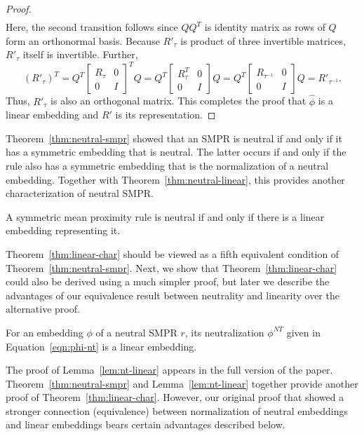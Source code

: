 \documentclass[prodmode]{acmsmall-ec14}
\newcommand{\nt}{NT}
\begin{document}
\begin{proof}
\begin{align*}
\end{align*}
Here, the second transition follows since $Q Q^T$ is identity matrix as rows of $Q$ form an orthonormal basis. Because $R'_{\tau}$ is product of three invertible matrices, $R'_{\tau}$ itself is invertible. Further, 
$$
(R'_{\tau})^T = Q^T \left[ \begin{smallmatrix} R_{\tau} & 0 \\ 0 & I \end{smallmatrix} \right]^T Q = Q^T \left[ \begin{smallmatrix} R_{\tau}^T & 0 \\ 0 & I \end{smallmatrix} \right] Q = Q^T \left[ \begin{smallmatrix} R_{\tau^{-1}} & 0 \\ 0 & I \end{smallmatrix} \right] Q
 = R'_{\tau^{-1}}.
 $$
Thus, $R'_{\tau}$ is also an orthogonal matrix. This completes the proof that $\hat{\phi}$ is a linear embedding and $R'$ is its representation.
\end{proof}

Theorem~\ref{thm:neutral-smpr} showed that an SMPR is neutral if and only if it has a symmetric embedding that is neutral. The latter occurs if and only if the rule also has a symmetric embedding that is the normalization of a neutral embedding. Together with Theorem~\ref{thm:neutral-linear}, this provides another characterization of neutral SMPR. 

\begin{theorem}
A symmetric mean proximity rule is neutral if and only if there is a linear embedding representing it.
\label{thm:linear-char}
\end{theorem}

Theorem~\ref{thm:linear-char} should be viewed as a fifth equivalent condition of Theorem~\ref{thm:neutral-smpr}. Next, we show that Theorem~\ref{thm:linear-char} could also be derived using a much simpler proof, but later we describe the advantages of our equivalence result between neutrality and linearity over the alternative proof. 

\begin{lemma}
For an embedding $\phi$ of a neutral SMPR $r$, its neutralization $\phi^{\nt}$ given in Equation~\eqref{eqn:phi-nt} is a linear embedding.
\label{lem:nt-linear}
\end{lemma}

The proof of Lemma~\ref{lem:nt-linear} appears in the full version of the paper. %
Theorem~\ref{thm:neutral-smpr} and Lemma~\ref{lem:nt-linear} together provide another proof of Theorem~\ref{thm:linear-char}. However, our original proof that showed a stronger connection (equivalence) between normalization of neutral embeddings and linear embeddings bears certain advantages described below.
\end{document}
